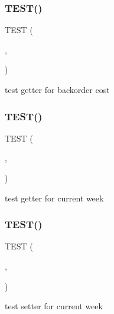 \subsubsection{\texorpdfstring{T\+E\+S\+T()}{TEST()}\hspace{0.1cm}{\footnotesize\ttfamily [28/54]}}
{\footnotesize\ttfamily T\+E\+ST (\begin{DoxyParamCaption}\item[{game\+Test}]{,  }\item[{get\+Backorder\+Cost\+Test}]{ }\end{DoxyParamCaption})}

test getter for backorder cost \mbox{\label{group__group2_ga7320537d208509a5c528cf94bbee8516}} 
\subsubsection{\texorpdfstring{T\+E\+S\+T()}{TEST()}\hspace{0.1cm}{\footnotesize\ttfamily [29/54]}}
{\footnotesize\ttfamily T\+E\+ST (\begin{DoxyParamCaption}\item[{game\+Test}]{,  }\item[{get\+Current\+Week\+Test}]{ }\end{DoxyParamCaption})}

test getter for current week \mbox{\label{group__group2_ga8b5c47aac0db966ef356cb734fcf045f}} 
\subsubsection{\texorpdfstring{T\+E\+S\+T()}{TEST()}\hspace{0.1cm}{\footnotesize\ttfamily [30/54]}}
{\footnotesize\ttfamily T\+E\+ST (\begin{DoxyParamCaption}\item[{game\+Test}]{,  }\item[{set\+Current\+Week\+Test}]{ }\end{DoxyParamCaption})}

test setter for current week \mbox{\label{group__group2_ga2aab8e43a7014d94f924bcc59f7bbd09}} 
